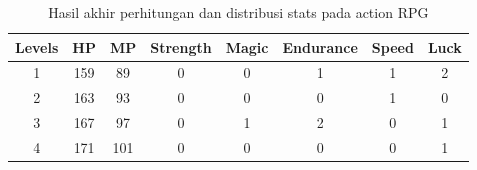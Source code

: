 \begin{table}[!h]
	\centering
	\caption{Hasil akhir perhitungan dan distribusi stats pada action RPG}
	\label{tb: result_player_stats_action}
	\begin{tabular}{|c|c|c|c|c|c|c|c|}
		\hline
		\rowcolor[HTML]{C0C0C0} 
		\textbf{Levels}                                   & \textbf{HP}                                       & \textbf{MP}                                       & \textbf{Strength}                                 & \textbf{Magic}                                    & \textbf{Endurance}                                & \textbf{Speed}                                    & \textbf{Luck}                                     \\ \hline
		1                                                 & 159                                               & 89                                                & 0                                                 & 0                                                 & 1                                                 & 1                                                 & 2                                                 \\ \hline
		2                                                 & 163                                               & 93                                                & 0                                                 & 0                                                 & 0                                                 & 1                                                 & 0                                                 \\ \hline
		3                                                 & 167                                               & 97                                                & 0                                                 & 1                                                 & 2                                                 & 0                                                 & 1                                                 \\ \hline
		4                                                 & 171                                               & 101                                               & 0                                                 & 0                                                 & 0                                                 & 0                                                 & 1                                                 \\ \hline

\end{tabular}
\end{table}
